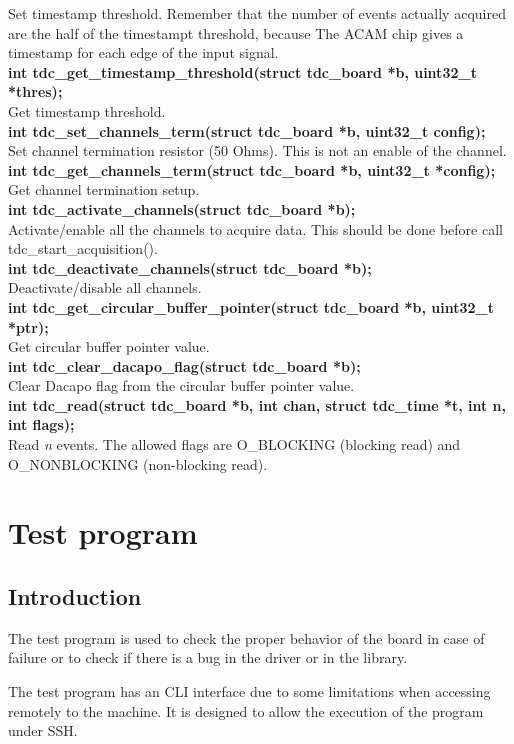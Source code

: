 \documentclass[a4paper,11pt]{article}
\begin{document}
Set timestamp threshold. Remember that the number of events actually acquired are the half of the timestampt threshold, because The ACAM chip gives a timestamp for each edge of the input signal. \\
\textbf{int tdc\_get\_timestamp\_threshold(struct tdc\_board *b, uint32\_t *thres);} \\
Get timestamp threshold.\\
\textbf{int tdc\_set\_channels\_term(struct tdc\_board *b, uint32\_t config);} \\
Set channel termination resistor (50 Ohms). This is not an enable of the channel. \\
\textbf{int tdc\_get\_channels\_term(struct tdc\_board *b, uint32\_t *config);} \\
Get channel termination setup. \\
\textbf{int tdc\_activate\_channels(struct tdc\_board *b);} \\
Activate/enable all the channels to acquire data. This should be done before call tdc\_start\_acquisition(). \\
\textbf{int tdc\_deactivate\_channels(struct tdc\_board *b);} \\
Deactivate/disable all channels. \\
\textbf{int tdc\_get\_circular\_buffer\_pointer(struct tdc\_board *b, uint32\_t *ptr);} \\
Get circular buffer pointer value.\\
\textbf{int tdc\_clear\_dacapo\_flag(struct tdc\_board *b);} \\
Clear Dacapo flag from the circular buffer pointer value.\\
\textbf{int tdc\_read(struct tdc\_board *b, int chan, struct tdc\_time *t,
		    int n, int flags);} \\
Read \textit{n} events. The allowed flags are O\_BLOCKING (blocking read) and O\_NONBLOCKING (non-blocking read).

\section{Test program}
\subsection{Introduction}
The test program is used to check the proper behavior of the board in case of failure or to check if there is a bug in the driver or in the library.

The test program has an CLI interface due to some limitations when accessing remotely to the machine. It is designed to allow the execution of the program under SSH.
\end{document}
